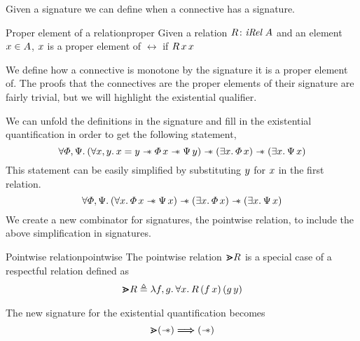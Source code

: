 \documentclass[thesis.tex]{subfiles}
\begin{document}
Given a signature we can define when a connective has a signature.
\begin{definition}{Proper element of a relation}{proper}
  Given a relation $R\colon\textit{iRel}\ A$ and an element $x\in A$, $x$ is a proper element of $\rel$ if $R\, x\, x$
\end{definition}
We define how a connective is monotone by the signature it is a proper element of. The proofs that the connectives are the proper elements of their signature are fairly trivial, but we will highlight the existential qualifier.


We can unfold the definitions in the signature and fill in the existential quantification in order to get the following statement,
\[\All \pred, \predB. (\All \var, \varB. \var = \varB \wand \pred\, \var \wand \predB\, \varB) \wand (\Exists \var. \pred\, \var) \wand (\Exists \var. \predB\, \var) \]
This statement can be easily simplified by substituting $y$ for $x$ in the first relation.
\[\All \pred, \predB. (\All \var. \pred\, \var \wand \predB\, \var) \wand (\Exists \var. \pred\, \var) \wand (\Exists \var. \predB\, \var) \]
We create a new combinator for signatures, the pointwise relation, to include the above simplification in signatures.
\begin{definition}{Pointwise relation}{pointwise}
  The pointwise relation $\bm{\gtrdot} R$ is a special case of a respectful relation defined as
  \begin{align*}
    \point \rel \eqdef \Lam \func, \funcB. \All \var. \rel\, (\func\, \var)\, (\funcB\, \varB)
  \end{align*}
\end{definition}
The new signature for the existential quantification becomes
\[\bm{\gtrdot} (\mathrel{-\!\!\ast}) \mathrel{\bm{\Longrightarrow}} (\mathrel{-\!\!\ast})\]
\end{document}
